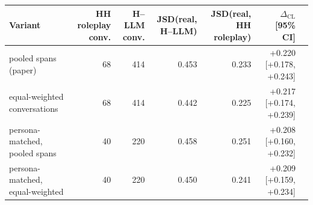 \begin{tabular}{lrrrrrr}
\toprule
Variant & HH roleplay conv. & H--LLM conv. & JSD(real, H--LLM) & JSD(real, HH roleplay) & $\Delta_{\mathrm{CL}}$ [95\% CI] \\
\midrule
pooled spans (paper) & 68 & 414 & 0.453 & 0.233 & +0.220 [+0.178, +0.243] \\
equal-weighted conversations & 68 & 414 & 0.442 & 0.225 & +0.217 [+0.174, +0.239] \\
persona-matched, pooled spans & 40 & 220 & 0.458 & 0.251 & +0.208 [+0.160, +0.232] \\
persona-matched, equal-weighted & 40 & 220 & 0.450 & 0.241 & +0.209 [+0.159, +0.234] \\
\bottomrule
\end{tabular}
